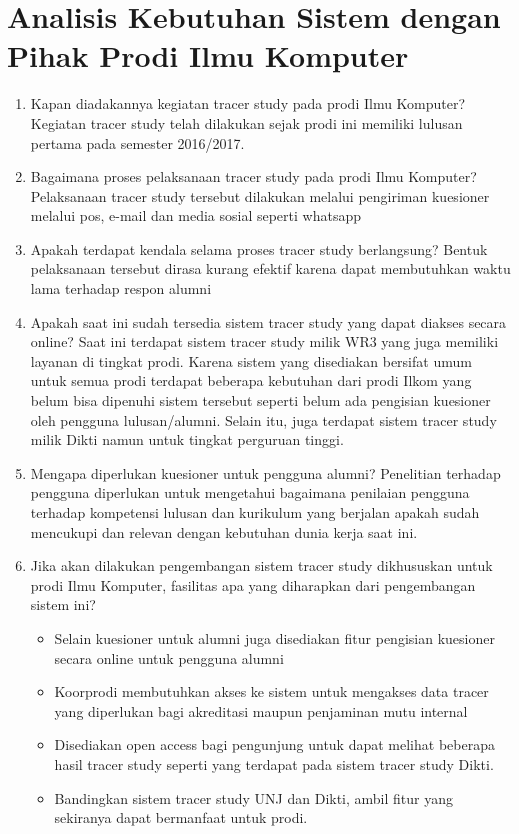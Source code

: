 \chapter{Analisis Kebutuhan Sistem dengan Pihak Prodi Ilmu Komputer}

\begin{enumerate}
	\item Kapan diadakannya kegiatan tracer study pada prodi Ilmu Komputer?
	Kegiatan tracer study telah dilakukan sejak prodi ini memiliki lulusan pertama pada semester 2016/2017.
	\item Bagaimana proses pelaksanaan tracer study pada prodi Ilmu Komputer?
	Pelaksanaan tracer study tersebut dilakukan melalui pengiriman kuesioner melalui pos, e-mail dan media sosial seperti whatsapp
	\item Apakah terdapat kendala selama proses tracer study berlangsung?
	Bentuk pelaksanaan tersebut dirasa kurang efektif karena dapat membutuhkan waktu lama terhadap respon alumni
	\item Apakah saat ini sudah tersedia sistem tracer study yang dapat diakses secara online?
	Saat ini terdapat sistem tracer study milik WR3 yang juga memiliki layanan di tingkat prodi. Karena sistem yang disediakan bersifat umum untuk semua prodi terdapat beberapa kebutuhan dari prodi Ilkom yang belum bisa dipenuhi sistem tersebut seperti belum ada pengisian kuesioner oleh pengguna lulusan/alumni.  Selain itu, juga terdapat sistem tracer study milik Dikti namun untuk tingkat perguruan tinggi. 
	\item Mengapa diperlukan kuesioner untuk pengguna alumni?
	Penelitian terhadap pengguna diperlukan untuk mengetahui bagaimana penilaian pengguna terhadap kompetensi lulusan dan kurikulum yang berjalan apakah sudah mencukupi dan relevan dengan kebutuhan dunia kerja saat ini. 
	\item Jika akan dilakukan pengembangan sistem tracer study dikhususkan untuk prodi Ilmu Komputer, fasilitas apa yang diharapkan dari pengembangan sistem ini?
	\begin{itemize}
		\item Selain kuesioner untuk alumni juga disediakan fitur pengisian kuesioner secara online untuk pengguna alumni
		\item Koorprodi membutuhkan akses ke sistem untuk mengakses data tracer yang diperlukan bagi akreditasi maupun penjaminan mutu internal
		\item Disediakan open access bagi pengunjung untuk dapat melihat beberapa hasil tracer study seperti yang terdapat pada sistem tracer study Dikti. 
		\item Bandingkan sistem tracer study UNJ dan Dikti, ambil fitur yang sekiranya dapat bermanfaat untuk prodi. 
	\end{itemize}	
\end{enumerate}
\vspace{0.8cm}

